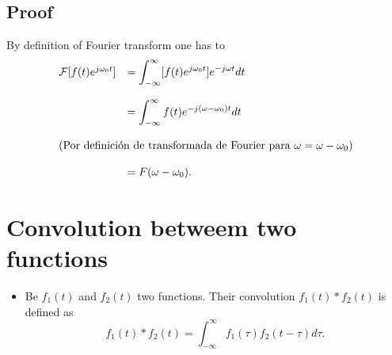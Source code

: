 \subsection*{Proof}
\noindent By definition of Fourier transform one has to
\begin{equation*}
  \begin{array}{rl}
    {\cal F}[f(t)e^{j\omega_0t}] & = \displaystyle\int_{-\infty}^\infty
    [f(t)e^{j\omega_0t}]e^{-j\omega t}dt\\\\
    & = \displaystyle\int_{-\infty}^\infty
    f(t)e^{-j(\omega-\omega_0)t}dt\\\\
    \multicolumn{2}{l}{\text{(Por definici\'on de transformada de Fourier
        para $\omega=\omega-\omega_0$)}}\\\\
    & = F(\omega-\omega_0).
  \end{array}
\end{equation*}

\section{Convolution betweem two functions}
\begin{itemize}
\item Be $f_1(t)$ and $f_2(t)$ two functions. Their convolution
  $f_1(t)*f_2(t)$ is defined as~\cite{Gonzalez}
  \begin{equation}
    f_1(t)*f_2(t)=\int_{-\infty}^\infty f_1(\tau)f_2(t-\tau)d\tau.
    \tag{$f_1(t)*f_2(t)$}%
    \label{eq:convolucion}
  \end{equation}
\end{itemize}

